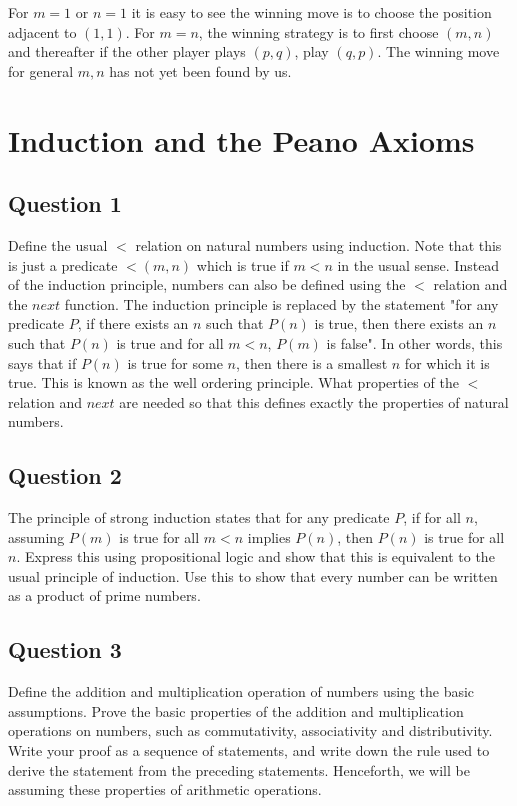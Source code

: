 \documentclass[12pt]{report}
\begin{document}
For $m = 1$ or $n = 1$ it is easy to see the winning move is to choose the position adjacent to $(1, 1)$. For $m = n$, the winning strategy is to first choose $(m, n)$ and thereafter if the other player plays $(p, q)$, play $(q, p)$. The winning move for general $m, n$ has not yet been found by us.
\chapter{Induction and the Peano Axioms}
\section*{Question 1}
Define the usual $<$ relation on natural numbers using induction. Note that this is just a predicate $<(m, n)$ which is true if $m < n$ in the usual sense. Instead of the induction principle, numbers can also be defined using the $<$ relation and the $next$ function. The induction principle is replaced by the statement "for any predicate $P$, if there exists an $n$ such that $P(n)$ is true, then there exists an $n$ such that $P(n)$ is true and for all $m < n$, $P(m)$ is false". In other words, this says that if $P(n)$ is true for some $n$, then there is a smallest $n$ for which it is true. This is known as the well ordering principle. What properties of the $<$ relation and $next$ are needed so that this defines exactly the properties of natural numbers.
\section*{Question 2}
The principle of strong induction states that for any predicate $P$, if for all $n$, assuming $P(m)$ is true for all $m < n$ implies $P(n)$, then $P(n)$ is true for all $n$. Express this using propositional logic and show that this is equivalent to the usual principle of induction. Use this to show that every number can be written as a product of prime numbers.
\section*{Question 3}
Define the addition and multiplication operation of numbers using the basic assumptions. Prove the basic properties of the addition and multiplication operations on numbers, such as commutativity, associativity and distributivity.
Write your proof as a sequence of statements, and write down the rule used to derive the statement from the preceding statements. Henceforth, we will be assuming these properties of arithmetic operations.
\end{document}
